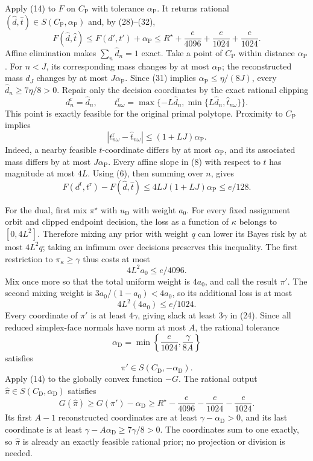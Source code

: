 Apply (14) to \(F\) on \(C_{\mathrm P}\) with tolerance \(\alpha_{\mathrm P}\).  It returns rational \((\widehat d,\widehat t)\in S(C_{\mathrm P},\alpha_{\mathrm P})\) and, by (28)--(32),
\[
 F(\widehat d,\widehat t)
 \le F(d',t')+\alpha_{\mathrm P}
 \le R^\star+\frac e{4096}+\frac e{1024}+\frac e{1024}.
\tag{33}
\]
Affine elimination makes \(\sum_n\widehat d_n=1\) exact.  Take a point of \(C_{\mathrm P}\) within distance \(\alpha_{\mathrm P}\).  For \(n<J\), its corresponding mass changes by at most \(\alpha_{\mathrm P}\); the reconstructed mass \(d_J\) changes by at most \(J\alpha_{\mathrm P}\).  Since (31) implies \(\alpha_{\mathrm P}\le\eta/(8J)\), every \(\widehat d_n\ge7\eta/8>0\).  Repair only the decision coordinates by the exact rational clipping
\[
 d_n^{\mathrm r}=\widehat d_n,
 \qquad
 t_{n\omega}^{\mathrm r}
 =\max\{-L\widehat d_n,
          \min\{L\widehat d_n,\widehat t_{n\omega}\}\}.
\tag{34}
\]
This point is exactly feasible for the original primal polytope.  Proximity to \(C_{\mathrm P}\) implies
\[
 |t_{n\omega}^{\mathrm r}-\widehat t_{n\omega}|
 \le(1+LJ)\alpha_{\mathrm P}.
\tag{35}
\]
Indeed, a nearby feasible \(t\)-coordinate differs by at most \(\alpha_{\mathrm P}\), and its associated mass differs by at most \(J\alpha_{\mathrm P}\).  Every affine slope in (8) with respect to \(t\) has magnitude at most \(4L\).  Using (6), then summing over \(n\), gives
\[
 F(d^{\mathrm r},t^{\mathrm r})-F(\widehat d,\widehat t)
 \le4LJ(1+LJ)\alpha_{\mathrm P}
 \le e/128.
\tag{36}
\]

For the dual, first mix \(\pi^\star\) with \(u_{\mathrm D}\) with weight \(a_0\).  For every fixed assignment orbit and clipped endpoint decision, the loss as a function of \(\kappa\) belongs to \([0,4L^2]\).  Therefore mixing any prior with weight \(q\) can lower its Bayes risk by at most \(4L^2q\); taking an infimum over decisions preserves this inequality.  The first restriction to \(\pi_\kappa\ge\gamma\) thus costs at most
\[
 4L^2a_0\le e/4096.
\tag{37}
\]
Mix once more so that the total uniform weight is \(4a_0\), and call the result \(\pi'\).  The second mixing weight is \(3a_0/(1-a_0)<4a_0\), so its additional loss is at most
\[
 4L^2(4a_0)\le e/1024.
\tag{38}
\]
Every coordinate of \(\pi'\) is at least \(4\gamma\), giving slack at least \(3\gamma\) in (24).  Since all reduced simplex-face normals have norm at most \(A\), the rational tolerance
\[
 \alpha_{\mathrm D}=\min\left\{\frac e{1024},\frac{\gamma}{8A}\right\}
\tag{39}
\]
satisfies
\[
 \pi'\in S(C_{\mathrm D},-\alpha_{\mathrm D}).
\tag{40}
\]
Apply (14) to the globally convex function \(-G\).  The rational output \(\widehat\pi\in S(C_{\mathrm D},\alpha_{\mathrm D})\) satisfies
\[
 G(\widehat\pi)
 \ge G(\pi')-\alpha_{\mathrm D}
 \ge R^\star-\frac e{4096}-\frac e{1024}-\frac e{1024}.
\tag{41}
\]
Its first \(A-1\) reconstructed coordinates are at least \(\gamma-\alpha_{\mathrm D}>0\), and its last coordinate is at least \(\gamma-A\alpha_{\mathrm D}\ge7\gamma/8>0\).  The coordinates sum to one exactly, so \(\widehat\pi\) is already an exactly feasible rational prior; no projection or division is needed.

